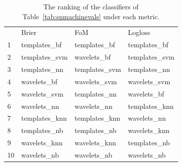 \begin{table}[]
\begin{tabular}{llll}
& Brier           & FoM             & Logloss       \\
1 & templates\_bf	 	& templates\_bf 	& templates\_bf \\
2 & templates\_svm 	& wavelets\_bf		& templates\_svm \\
3 & templates\_nn 	& templates\_svm	& templates\_nn \\
4 & wavelets\_bf 		& wavelets\_svm		& wavelets\_svm \\
5 & wavelets\_svm 	& templates\_nn		& wavelets\_bf \\
6 & wavelets\_nn 		& wavelets\_nn		& templates\_knn \\
7 & templates\_knn 	& templates\_knn	& wavelets\_nn \\
8 & templates\_nb 	& templates\_nb		& wavelets\_knn \\
9 & wavelets\_knn 	& wavelets\_knn		& templates\_nb \\
10 & wavelets\_nb 		& wavelets\_nb		& wavelets\_nb \\
\end{tabular}
\caption{The ranking of the classifiers of Table~\ref{tab:snmachinevals} under each metric.}
\label{tab:snmachinerank}
\end{table}

